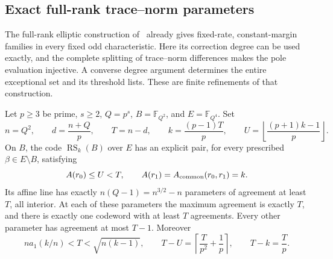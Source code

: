 \subsection{Exact full-rank trace--norm parameters}
\label{sec:odd-trace-norm-refinement}
The full-rank elliptic construction of~\cite{binary-counterexamples}
already gives fixed-rate, constant-margin families in every fixed odd
characteristic. Here its correction degree can be used exactly, and
the complete splitting of trace--norm differences makes the pole
evaluation injective. A converse degree argument determines the entire
exceptional set and its threshold lists. These are finite refinements
of that construction.

\begin{theorem}\label{thm:odd-trace-norm-refinement}
Let $p\ge3$ be prime, $s\ge2$, $Q=p^s$, $B=\mathbb F_{Q^2}$,
and $E=\mathbb F_{Q^4}$. Set
\[
 n=Q^2,\qquad d=\frac{n+Q}{p},\qquad T=n-d,\qquad
 k=\frac{(p-1)T}{p},\qquad
 U=\left\lfloor\frac{(p+1)k-1}{p}\right\rfloor.
\]
On $B$, the code $\operatorname{RS}_k(B)$ over $E$ has an explicit
pair, for every prescribed $\beta\in E\setminus B$, satisfying
\[
 A(r_0)\le U<T,\qquad A(r_1)=A_{\rm common}(r_0,r_1)=k.
\]
Its affine line has exactly $n(Q-1)=n^{3/2}-n$ parameters of agreement
at least $T$, all interior. At each of these parameters the maximum
agreement is exactly $T$, and there is exactly one codeword with at
least $T$ agreements. Every other parameter has agreement at most
$T-1$. Moreover
\[
 na_1(k/n)<T<\sqrt{n(k-1)},\qquad
 T-U=\left\lceil\frac{T}{p^2}+\frac1p\right\rceil,\qquad
 T-k=\frac Tp.
\]
\end{theorem}
